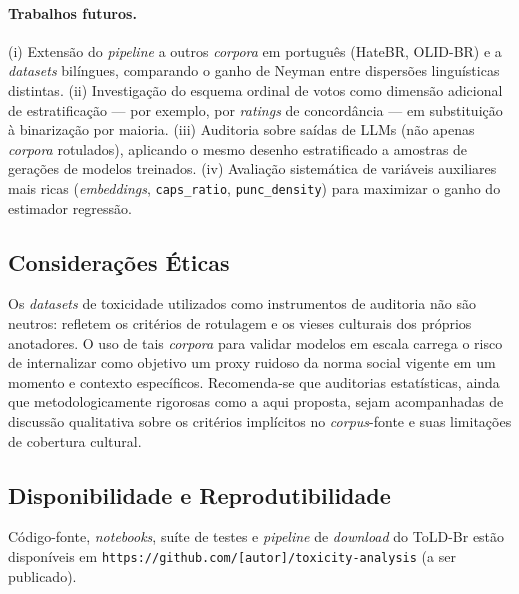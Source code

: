\paragraph{Trabalhos futuros.}
(i) Extensão do \textit{pipeline} a outros \textit{corpora} em português
(HateBR, OLID-BR) e a \textit{datasets} bilíngues, comparando o ganho de
Neyman entre dispersões linguísticas distintas.
(ii) Investigação do esquema ordinal de votos como dimensão adicional de
estratificação --- por exemplo, por \textit{ratings} de concordância --- em
substituição à binarização por maioria.
(iii) Auditoria sobre saídas de LLMs (não apenas \textit{corpora} rotulados),
aplicando o mesmo desenho estratificado a amostras de gerações de modelos
treinados.
(iv) Avaliação sistemática de variáveis auxiliares mais ricas
(\textit{embeddings}, \texttt{caps\_ratio}, \texttt{punc\_density}) para
maximizar o ganho do estimador regressão.

\subsection*{Considerações Éticas}

Os \textit{datasets} de toxicidade utilizados como instrumentos de auditoria
não são neutros: refletem os critérios de rotulagem e os vieses culturais
dos próprios anotadores. O uso de tais \textit{corpora} para validar modelos
em escala carrega o risco de internalizar como objetivo um proxy ruidoso da
norma social vigente em um momento e contexto específicos. Recomenda-se que
auditorias estatísticas, ainda que metodologicamente rigorosas como a aqui
proposta, sejam acompanhadas de discussão qualitativa sobre os critérios
implícitos no \textit{corpus}-fonte e suas limitações de cobertura cultural.

\subsection*{Disponibilidade e Reprodutibilidade}

Código-fonte, \textit{notebooks}, suíte de testes e \textit{pipeline} de
\textit{download} do ToLD-Br estão disponíveis em
\texttt{https://github.com/[autor]/toxicity-analysis} (a ser publicado).
